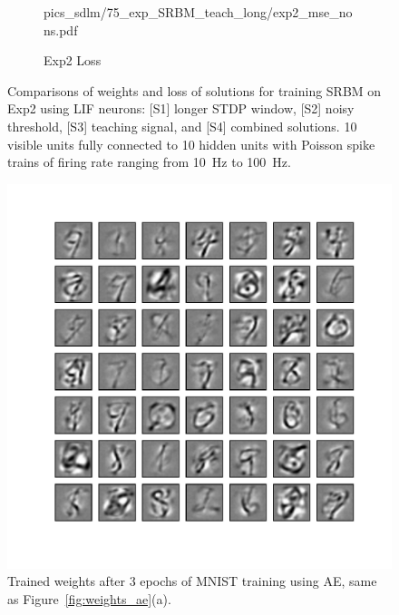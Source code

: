 \begin{figure}
\begin{subfigure}[c]{0.48\textwidth}
{			{pics_sdlm/75_exp_SRBM_teach_long/exp2_mse_nons.pdf}}\\
		\caption{Exp2 Loss}
	\end{subfigure}%
	\caption[Comparisons of solutions in training SRBM using LIF.]{Comparisons of weights and loss of solutions for training SRBM on Exp2 using LIF neurons: [S1] longer STDP window, [S2] noisy threshold, [S3] teaching signal, and [S4] combined solutions. 10 visible units fully connected to 10 hidden units with Poisson spike trains of firing rate ranging from 10~Hz to 100~Hz.}
	\label{fig:LIF_srbm}
\end{figure}


\begin{figure}
	\centering
	\includegraphics[width=\textwidth]{pics_sdlm/22_MNIST_AE/2_60000_0.pdf}
	\caption[Trained weights of AE, same as Figure~\ref{fig:weights_ae}(a).]{Trained weights after 3 epochs of MNIST training using AE, same as Figure~\ref{fig:weights_ae}(a).}
	\label{fig:weights_ae1}
\end{figure}


